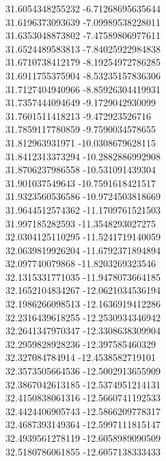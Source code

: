 {31.6054348255232	-6.71268695635644\\
31.6196373093639	-7.09989538228011\\
31.6353048873802	-7.47589806977611\\
31.6524489583813	-7.84025922984838\\
31.6710738412179	-8.19254972786285\\
31.6911755375904	-8.53235157836306\\
31.7127404940966	-8.85926304419931\\
31.7357444094649	-9.1729042930099\\
31.7601511418213	-9.472923526716\\
31.7859117780859	-9.7590034578655\\
31.812963931971	-10.0308679628115\\
31.8412313373294	-10.2882886992908\\
31.8706237986558	-10.531091439304\\
31.901037549643	-10.7591618421517\\
31.9323560536586	-10.9724503818669\\
31.9644512574362	-11.1709761521503\\
31.997185282593	-11.3548293027275\\
32.0304125110295	-11.5241719140059\\
32.0639819926204	-11.6792371894894\\
32.097740079868	-11.8203269323546\\
32.1315331771035	-11.9478073664185\\
32.1652104834267	-12.0621034536194\\
32.1986266098513	-12.1636919412286\\
32.2316439618255	-12.2530934346942\\
32.2641347970347	-12.3308638309904\\
32.2959828928236	-12.397585460329\\
32.327084784914	-12.4538582719101\\
32.3573505664536	-12.5002913655909\\
32.3867042613185	-12.5374951214131\\
32.4150838061316	-12.5660741192533\\
32.4424406905743	-12.5866209778317\\
32.4687393149364	-12.5997111815147\\
32.4939561278119	-12.6058989090509\\
32.5180786061855	-12.6057138333433\\
}

